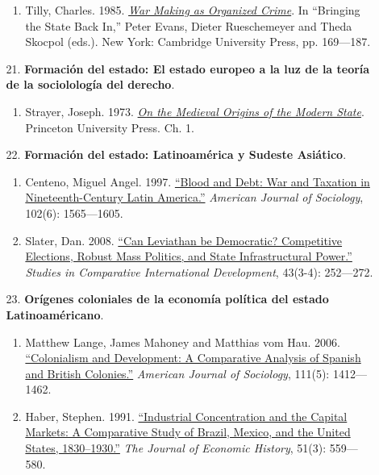 \documentclass[letterpaper]{article}
\begin{document}
\begin{enumerate}
\begin{enumerate}
\begin{enumerate}
					\item Tilly, Charles. 1985. \href{https://github.com/hbahamonde/Ciencia_Politica_I/raw/master/Readings/Tilly.pdf}{\emph{War Making as Organized Crime}}. In ``Bringing the State Back In,'' Peter Evans, Dieter Rueschemeyer and Theda Skocpol (eds.). New York: Cambridge University Press, pp. 169---187.
				\end{enumerate}
			
			\item[21.] {\bf Formaci\'on del estado: El estado europeo a la luz de la teor\'ia de la sociololog\'ia del derecho}.
				\begin{enumerate} 
					\item Strayer, Joseph. 1973. \href{https://github.com/hbahamonde/Ciencia_Politica_I/raw/master/Readings/Strayer.pdf}{\emph{On the Medieval Origins of the Modern State}}. Princeton University Press. Ch. 1.
				\end{enumerate}

			\item[22.] {\bf Formaci\'on del estado: Latinoam\'erica y Sudeste Asi\'atico}.
				\begin{enumerate}
					\item Centeno, Miguel Angel. 1997. \href{https://github.com/hbahamonde/Ciencia_Politica_I/raw/master/Readings/Centeno.pdf}{``Blood and Debt: War and Taxation in Nineteenth-Century Latin America.''} \emph{American Journal of Sociology}, 102(6): 1565---1605. 
					
					\item Slater, Dan. 2008. \href{https://github.com/hbahamonde/Ciencia_Politica_I/raw/master/Readings/Slater.pdf}{``Can Leviathan be Democratic? Competitive Elections, Robust Mass Politics, and State Infrastructural Power.''} \emph{Studies in Comparative International Development}, 43(3-4): 252---272.
				\end{enumerate}


      \item[23.] {\bf Or\'igenes coloniales de la econom\'ia pol\'itica del estado Latinoam\'ericano}.
        \begin{enumerate}
          \item Matthew Lange, James Mahoney and Matthias vom Hau. 2006. \href{https://github.com/hbahamonde/Ciencia_Politica_I/raw/master/Readings/Mahoney_et_al_2006.pdf}{``Colonialism and Development: A Comparative Analysis of Spanish and British Colonies.''} \emph{American Journal of Sociology}, 111(5): 1412---1462.
          \item Haber, Stephen. 1991. \href{https://github.com/hbahamonde/Ciencia_Politica_I/raw/master/Readings/Haber_1991.pdf}{``Industrial Concentration and the Capital Markets: A Comparative Study of Brazil, Mexico, and the United States, 1830–1930.''} \emph{The Journal of Economic History}, 51(3): 559---580.
        \end{enumerate}


\end{enumerate}
\end{enumerate}
\end{document}
